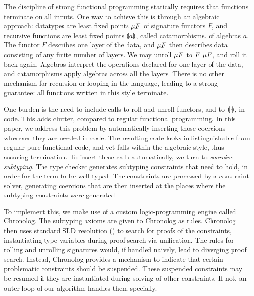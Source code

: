 \documentclass[runningheads]{llncs}
\begin{document}
The discipline of strong functional programming statically requires
that functions terminate on all inputs.  One way to achieve this is
through an algebraic approach: datatypes are least fixed points
$\mu F$ of signature functors $F$, and recursive functions are least
fixed points $\llparenthesis a \rrparenthesis$, called catamorphisms, of algebras $a$.  The
functor $F$ describes one layer of the data, and $\mu F$ then
describes data consisting of any finite number of layers.  We may
unroll $\mu F$ to $F ~ \mu F$, and roll it back
again.  Algebras interpret the operations declared for one layer of
the data, and catamorphisms apply algebras across all the layers.
There is no other mechanism for recursion or looping in the language,
leading to a strong guarantee: all functions written in this style
terminate.

One burden is the need to include calls to roll and unroll functors,
and to $\llparenthesis \cdot \rrparenthesis$, in code.  This adds clutter, compared to regular
functional programming.  In this paper, we address this problem by
automatically inserting those coercions wherever they are needed in
code.  The resulting code looks indistinguishable from regular
pure-functional code, and yet falls within the algebraic style, thus
assuring termination.  To insert these calls automatically, we turn to
\emph{coercive subtyping}.  The type checker generates subtyping
constraints that need to hold, in order for the term to be well-typed.
The constraints are processed by a constraint solver, generating
coercions that are then inserted at the places where the subtyping
constraints were generated.

To implement this, we make use of a custom logic-programming engine
called Chronolog.  The subtyping axioms are given to Chronolog as
rules.  Chronolog then uses standard SLD resolution
(\cite{apt+82,Kowalski1974}) to search for proofs of the constraints,
instantiating type variables during proof search via unification.  The
rules for rolling and unrolling signatures would, if handled naively,
lead to diverging proof search.  Instead, Chronolog provides a
mechanism to indicate that certain problematic constraints should be
suspended.  These suspended constraints may be resumed if they are
instantiated during solving of other constraints.  If not, an outer
loop of our algorithm handles them specially.
\end{document}
